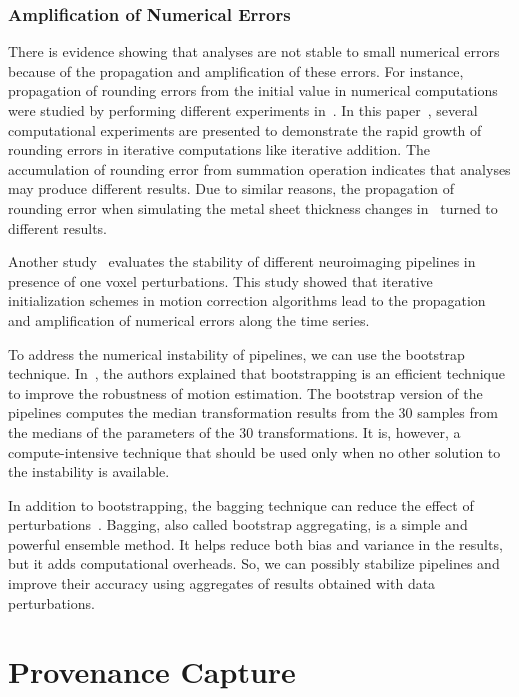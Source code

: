 \subsubsection{Amplification of Numerical Errors}

There is evidence showing that analyses are not stable to small numerical 
errors because of the propagation and amplification of these errors. 
For instance, propagation of rounding errors from the initial value in 
numerical computations were studied by performing different experiments 
in~\cite{fadnavis1998some}. In this paper~\cite{fadnavis1998some}, several computational 
experiments are presented to demonstrate the rapid growth of rounding 
errors in iterative computations like iterative addition. The 
accumulation of rounding error from summation operation indicates that 
analyses may produce different results. Due to similar reasons, the 
propagation of rounding error when simulating the metal sheet thickness 
changes in~\cite{diethelm2012limits} turned to different results.

Another study~\cite{Glatard2018hbm} evaluates the stability of different 
neuroimaging pipelines in presence of one voxel perturbations. This 
study showed that iterative initialization schemes in motion correction 
algorithms lead to the propagation and amplification of numerical 
errors along the time series. 

To address the numerical instability of pipelines, we can use the bootstrap 
technique. In~\cite{Glatard2018hbm}, the authors explained that bootstrapping 
is an efficient technique to improve the robustness of motion 
estimation. The bootstrap version of the pipelines computes the median 
transformation results from the 30 samples from the medians of the 
parameters of the 30 transformations. It is, however, a 
compute-intensive technique that should be used only when no other 
solution to the instability is available. 

In addition to bootstrapping, the bagging technique can 
reduce the effect of perturbations~\cite{breiman1996bagging, 
breiman1996heuristics}. Bagging, also called bootstrap aggregating, is 
a simple and powerful ensemble method. It helps reduce both bias and 
variance in the results, but it adds computational overheads.
So, we can possibly stabilize pipelines and improve 
their accuracy using aggregates of results obtained with data 
perturbations. 


\section{Provenance Capture}
\label{sec:provenance-capture}

